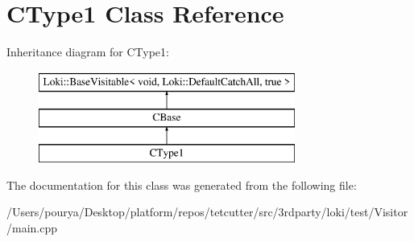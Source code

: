 \hypertarget{classCType1}{}\section{C\+Type1 Class Reference}
\label{classCType1}
Inheritance diagram for C\+Type1\+:\begin{figure}[H]
\begin{center}
\leavevmode
\includegraphics[height=3.000000cm]{classCType1}
\end{center}
\end{figure}


The documentation for this class was generated from the following file\+:\begin{DoxyCompactItemize}
\item 
/\+Users/pourya/\+Desktop/platform/repos/tetcutter/src/3rdparty/loki/test/\+Visitor/main.\+cpp\end{DoxyCompactItemize}
